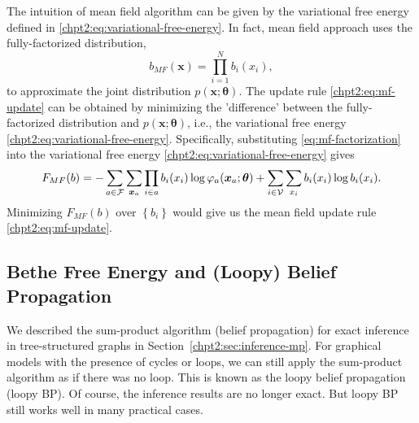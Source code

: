 The intuition of mean field algorithm can be given by the variational free energy defined in \eqref{chpt2:eq:variational-free-energy}. In fact, mean field approach uses the fully-factorized distribution,
\begin{equation}\label{eq:mf-factorization}
  b_{MF}(\bm{x}) = \prod_{i=1}^{N}b_i(x_i),
\end{equation}
to approximate the joint distribution $p(\bm{x};\bm{\theta})$. The update rule \eqref{chpt2:eq:mf-update} can be obtained by minimizing the 'difference' between the fully-factorized distribution and $p(\bm{x};\bm{\theta})$, i.e., the variational free energy \eqref{chpt2:eq:variational-free-energy}. Specifically,
substituting \eqref{eq:mf-factorization} into the variational free energy \eqref{chpt2:eq:variational-free-energy} gives
\begin{align}
  F_{MF}(b) =  - \sum_{a \in \mathcal{F}}\sum_{\bm{x}_{a}} \prod_{i\in a}b_i(x_i)\log{\varphi_{a}(\bm{x}_{a};\bm{\theta})}
   + \sum_{i \in \mathcal{V}} \sum_{x_i} b_i(x_i) \log{b_i(x_i)}.
\end{align}
Minimizing $F_{MF}(b)$ over $\left\{ b_i \right\}$ would give us the mean field update rule \eqref{chpt2:eq:mf-update}.

\subsection{Bethe Free Energy and (Loopy) Belief Propagation}

We described the sum-product algorithm (belief propagation) for exact inference in tree-structured graphs in Section~\ref{chpt2:sec:inference-mp}. For graphical models with the presence of cycles or loops, we can still apply the sum-product algorithm as if there was no loop. This is known as the loopy belief propagation (loopy BP). Of course, the inference results are no longer exact. But loopy BP still works well in many practical cases.

